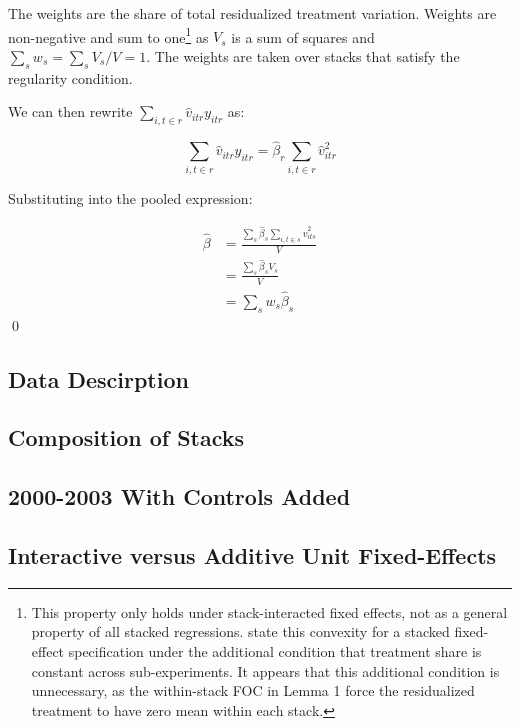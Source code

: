 \documentclass[12pt]{article}
\begin{document}
The weights are the share of total residualized treatment variation. Weights are non-negative and sum to one\footnote{This property only holds under stack-interacted fixed effects, not as a general property of all stacked regressions. \textcite{wing2024stacked} state this convexity for a stacked fixed-effect specification under the additional condition that treatment share is constant across sub-experiments. It appears that this additional condition is unnecessary, as the within-stack FOC in Lemma 1 force the residualized treatment to have zero mean within each stack.} as $V_s$ is a sum of squares and $\sum_s w_s = \sum_s V_s / V = 1$. The weights are taken over stacks that satisfy the regularity condition.

We can then rewrite $\sum_{i,t \in r} \hat{v}_{itr} y_{itr}$ as:

\begin{equation*}
    \sum_{i,t \in r} \hat{v}_{itr} y_{itr} = \hat{\beta}_r \sum_{i,t \in r} \hat{v}_{itr}^2
\end{equation*}

Substituting into the pooled expression:

\begin{align*}
    \hat{\beta} &= \frac{\sum_s \hat{\beta}_s \sum_{i,t \in s} \hat{v}_{its}^2}{V} \\
    &= \frac{\sum_s \hat{\beta}_s V_s}{V} \\
    &= \sum_s w_s \hat{\beta}_s 
\end{align*} \qed

\newpage

\subsection*{Data Descirption}



\newpage

\subsection*{Composition of Stacks}



\newpage

\subsection*{2000-2003 With Controls Added}



\newpage

\subsection*{Interactive versus Additive Unit Fixed-Effects}


\end{document}
